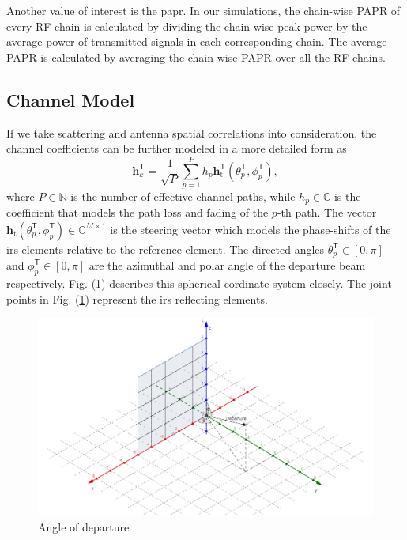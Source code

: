 \documentclass[12pt,draftclsnofoot,onecolumn,journal]{IEEEtran}
\begin{document}
Another value of interest is  the \ac{papr}. In our simulations, the chain-wise PAPR of every RF chain is calculated by dividing the chain-wise peak power by the average power of transmitted signals in each corresponding chain. The average PAPR is calculated by averaging the chain-wise PAPR over all the RF chains. 

\subsection{Channel Model}
If we take scattering and antenna spatial correlations into consideration, the channel coefficients can be further modeled in a more detailed form as \cite{jamali2020intelligent}
\begin{equation}
\mathbf h_k^{\mathsf{T}}=\frac{1}{\sqrt{P}}\sum_{p=1}^{P}h_p\mathbf h_{\mathrm t}^{\mathsf{T}}(\theta_p^{\mathsf{T}}, \phi_p^{\mathsf{T}}),
\label{eq:fullchanneldes}
\end{equation}
where $P\in \mathbb N$ is the number of effective channel paths, while $h_p\in \mathbb C$ is the coefficient that models the path loss and fading of the $p$-th path. The vector $\mathbf h_{\mathrm t}(\theta_p^{\mathsf{T}}, \phi_p^{\mathsf{T}}) \in \mathbb C^{M\times 1}$ is the steering vector which models the phase-shifts of the \ac{irs} elements relative to the reference element. The directed angles $\theta_p^{\mathsf{T}}\in[0,\pi]$ and  $\phi_p^{\mathsf{T}}\in[0,\pi]$ are the azimuthal and polar angle of the departure beam respectively. Fig. (\ref{fig:sphangle}) describes this spherical cordinate system closely. The joint points in Fig. (\ref{fig:sphangle}) represent the \ac{irs} reflecting elements.

\begin{figure}[htbp]
\includegraphics[width=6in]{channelillus.png} 
\caption{Angle of departure} \label{fig:sphangle}
\end{figure}
\end{document}

